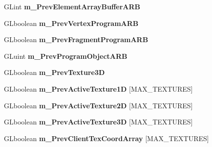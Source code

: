 \begin{DoxyCompactItemize}
\item 
\hypertarget{class_c_tw_graph_open_g_l_a15fc057be805961cae4b5ef3c23e8396}{G\+Lint {\bfseries m\+\_\+\+Prev\+Element\+Array\+Buffer\+A\+R\+B}}\label{class_c_tw_graph_open_g_l_a15fc057be805961cae4b5ef3c23e8396}

\item 
\hypertarget{class_c_tw_graph_open_g_l_a1a05621afa56ab54ab627446155ee593}{G\+Lboolean {\bfseries m\+\_\+\+Prev\+Vertex\+Program\+A\+R\+B}}\label{class_c_tw_graph_open_g_l_a1a05621afa56ab54ab627446155ee593}

\item 
\hypertarget{class_c_tw_graph_open_g_l_a34802c5ee13e79eeedf87a028e807709}{G\+Lboolean {\bfseries m\+\_\+\+Prev\+Fragment\+Program\+A\+R\+B}}\label{class_c_tw_graph_open_g_l_a34802c5ee13e79eeedf87a028e807709}

\item 
\hypertarget{class_c_tw_graph_open_g_l_ab8f9cb47bf18405f51e657562e57f07f}{G\+Luint {\bfseries m\+\_\+\+Prev\+Program\+Object\+A\+R\+B}}\label{class_c_tw_graph_open_g_l_ab8f9cb47bf18405f51e657562e57f07f}

\item 
\hypertarget{class_c_tw_graph_open_g_l_a6033145e5ad77af129ebf65553c9e9af}{G\+Lboolean {\bfseries m\+\_\+\+Prev\+Texture3\+D}}\label{class_c_tw_graph_open_g_l_a6033145e5ad77af129ebf65553c9e9af}

\item 
\hypertarget{class_c_tw_graph_open_g_l_a6dd12030cf7fde55c04da5bda555c42c}{G\+Lboolean {\bfseries m\+\_\+\+Prev\+Active\+Texture1\+D} \mbox{[}M\+A\+X\+\_\+\+T\+E\+X\+T\+U\+R\+E\+S\mbox{]}}\label{class_c_tw_graph_open_g_l_a6dd12030cf7fde55c04da5bda555c42c}

\item 
\hypertarget{class_c_tw_graph_open_g_l_a991aea46a7695aef39937c9413d063fc}{G\+Lboolean {\bfseries m\+\_\+\+Prev\+Active\+Texture2\+D} \mbox{[}M\+A\+X\+\_\+\+T\+E\+X\+T\+U\+R\+E\+S\mbox{]}}\label{class_c_tw_graph_open_g_l_a991aea46a7695aef39937c9413d063fc}

\item 
\hypertarget{class_c_tw_graph_open_g_l_a14ac540e846fe8db2935f46619b9e228}{G\+Lboolean {\bfseries m\+\_\+\+Prev\+Active\+Texture3\+D} \mbox{[}M\+A\+X\+\_\+\+T\+E\+X\+T\+U\+R\+E\+S\mbox{]}}\label{class_c_tw_graph_open_g_l_a14ac540e846fe8db2935f46619b9e228}

\item 
\hypertarget{class_c_tw_graph_open_g_l_aeff45cf1b6147cc939e2e769fe92878b}{G\+Lboolean {\bfseries m\+\_\+\+Prev\+Client\+Tex\+Coord\+Array} \mbox{[}M\+A\+X\+\_\+\+T\+E\+X\+T\+U\+R\+E\+S\mbox{]}}\label{class_c_tw_graph_open_g_l_aeff45cf1b6147cc939e2e769fe92878b}


\end{DoxyCompactItemize}
